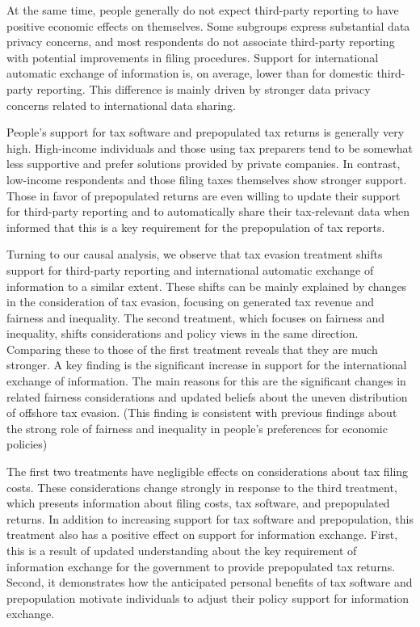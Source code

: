 \documentclass[12pt]{article}
\begin{document}
At the same time, people generally do not expect third-party reporting to have positive economic effects on themselves. Some subgroups express substantial data privacy concerns, and most respondents do not associate third-party reporting with potential improvements in filing procedures. Support for international automatic exchange of information is, on average, lower than for domestic third-party reporting. This difference is mainly driven by stronger data privacy concerns related to international data sharing.

People's support for tax software and prepopulated tax returns is generally very high. High-income individuals and those using tax preparers tend to be somewhat less supportive and prefer solutions provided by private companies. In contrast, low-income respondents and those filing taxes themselves show stronger support. Those in favor of prepopulated returns are even willing to update their support for third-party reporting and to automatically share their tax-relevant data when informed that this is a key requirement for the prepopulation of tax reports.

Turning to our causal analysis, we observe that tax evasion treatment shifts support for third-party reporting and international automatic exchange of information to a similar extent. These shifts can be mainly explained by changes in the consideration of tax evasion, focusing on generated tax revenue and fairness and inequality. The second treatment, which focuses on fairness and inequality, shifts considerations and policy views in the same direction. Comparing these to those of the first treatment reveals that they are much stronger. A key finding is the significant increase in support for the international exchange of information. The main reasons for this are the significant changes in related fairness considerations and updated beliefs about the uneven distribution of offshore tax evasion. (This finding is consistent with previous findings about the strong role of fairness and inequality in people's preferences for economic policies)

The first two treatments have negligible effects on considerations about tax filing costs. These considerations change strongly in response to the third treatment, which presents information about filing costs, tax software, and prepopulated returns. In addition to increasing support for tax software and prepopulation, this treatment also has a positive effect on support for information exchange. First, this is a result of updated understanding about the key requirement of information exchange for the government to provide prepopulated tax returns. Second, it demonstrates how the anticipated personal benefits of tax software and prepopulation motivate individuals to adjust their policy support for information exchange. 
\end{document}
